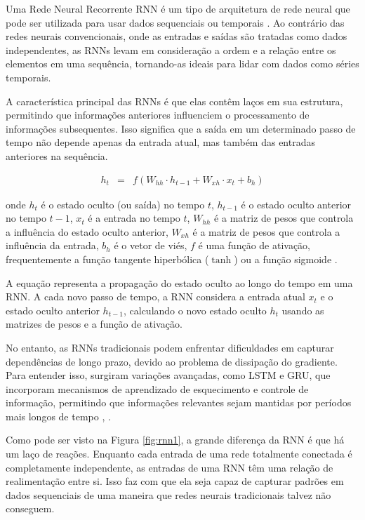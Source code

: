  Uma Rede Neural Recorrente RNN é um tipo de arquitetura de rede neural que pode ser utilizada para usar dados sequenciais ou temporais \cite{NASIRI2023110867}. Ao contrário das redes neurais convencionais, onde as entradas e saídas são tratadas como dados independentes, as RNNs levam em consideração a ordem e a relação entre os elementos em uma sequência, tornando-as ideais para lidar com dados como séries temporais.
 
 A característica principal das RNNs é que elas contêm laços em sua estrutura, permitindo que informações anteriores influenciem o processamento de informações subsequentes. Isso significa que a saída em um determinado passo de tempo não depende apenas da entrada atual, mas também das entradas anteriores na sequência.
  
 \begin{eqnarray}
 	h_t &=& f(W_{hh} \cdot h_{t-1} + W_{xh} \cdot x_t + b_h)\label{eq:rnn}
 \end{eqnarray}
 
 \noindent onde $ h_t $ é o estado oculto (ou saída) no tempo $ t $, $ h_{t-1} $ é o estado oculto anterior no tempo $ t-1 $, $ x_t $ é a entrada no tempo $ t $, $ W_{hh} $ é a matriz de pesos que controla a influência do estado oculto anterior, $ W_{xh} $ é a matriz de pesos que controla a influência da entrada, $ b_h $ é o vetor de viés, $ f $ é uma função de ativação, frequentemente a função tangente hiperbólica ($\operatorname{tanh}$) ou a função sigmoide \cite{lstm}.
 
 A equação representa a propagação do estado oculto ao longo do tempo em uma RNN. A cada novo passo de tempo, a RNN considera a entrada atual $ x_t $ e o estado oculto anterior $ h_{t-1} $, calculando o novo estado oculto $ h_t $ usando as matrizes de pesos e a função de ativação. 
 
  No entanto, as RNNs tradicionais podem enfrentar dificuldades em capturar dependências de longo prazo, devido ao problema de dissipação do gradiente. Para entender isso, surgiram variações avançadas, como LSTM  e GRU, que incorporam mecanismos de aprendizado de esquecimento e controle de informação, permitindo que informações relevantes sejam mantidas por períodos mais longos de tempo \cite{WANG2023116247}, \cite{ZHAO2023114136}.
 
 Como pode ser visto na Figura \ref{fig:rnn1}, a grande diferença da RNN é que há um laço de reações. Enquanto cada entrada de uma rede totalmente conectada é completamente independente, as entradas de uma RNN têm uma relação de realimentação entre si. Isso faz com que ela seja capaz de capturar padrões em dados sequenciais de uma maneira que redes neurais tradicionais talvez não conseguem.
  
